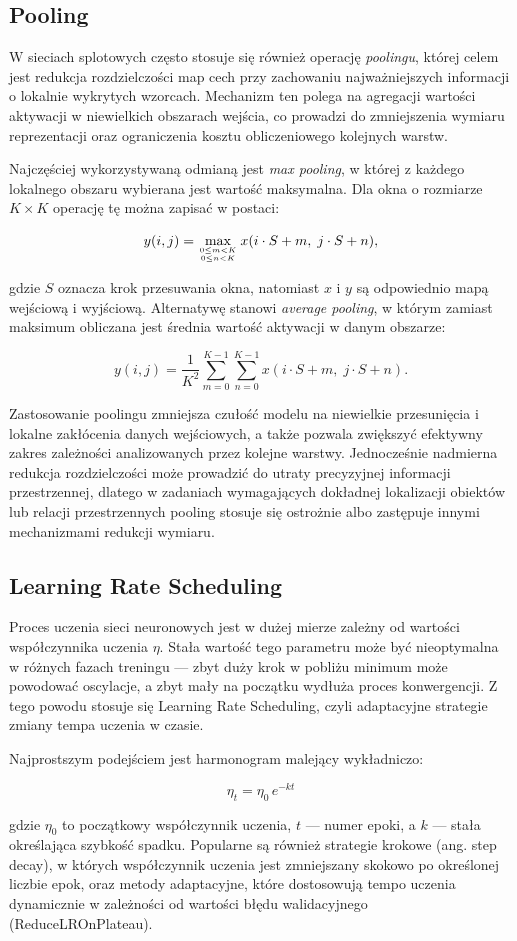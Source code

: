 \subsection*{Pooling}

W sieciach splotowych często stosuje się również operację \textit{poolingu}, której celem jest redukcja rozdzielczości map cech przy zachowaniu najważniejszych informacji o lokalnie wykrytych wzorcach. Mechanizm ten polega na agregacji wartości aktywacji w niewielkich obszarach wejścia, co prowadzi do zmniejszenia wymiaru reprezentacji oraz ograniczenia kosztu obliczeniowego kolejnych warstw.

Najczęściej wykorzystywaną odmianą jest \textit{max pooling}, w której z każdego lokalnego obszaru wybierana jest wartość maksymalna. Dla okna o rozmiarze $K \times K$ operację tę można zapisać w postaci:

\[
y(i,j) = \max_{0 \leq m < K \atop 0 \leq n < K} x(i \cdot S + m,\; j \cdot S + n),
\]

gdzie $S$ oznacza krok przesuwania okna, natomiast $x$ i $y$ są odpowiednio mapą wejściową i wyjściową. Alternatywę stanowi \textit{average pooling}, w którym zamiast maksimum obliczana jest średnia wartość aktywacji w danym obszarze:

\[
y(i,j) = \frac{1}{K^2} \sum_{m=0}^{K-1} \sum_{n=0}^{K-1} x(i \cdot S + m,\; j \cdot S + n).
\]

Zastosowanie poolingu zmniejsza czułość modelu na niewielkie przesunięcia i lokalne zakłócenia danych wejściowych, a także pozwala zwiększyć efektywny zakres zależności analizowanych przez kolejne warstwy. Jednocześnie nadmierna redukcja rozdzielczości może prowadzić do utraty precyzyjnej informacji przestrzennej, dlatego w zadaniach wymagających dokładnej lokalizacji obiektów lub relacji przestrzennych pooling stosuje się ostrożnie albo zastępuje innymi mechanizmami redukcji wymiaru. 

\subsection*{Learning Rate Scheduling}

Proces uczenia sieci neuronowych jest w dużej mierze zależny od wartości współczynnika uczenia $\eta$. Stała wartość tego parametru może być nieoptymalna w różnych fazach treningu — zbyt duży krok w pobliżu minimum może powodować oscylacje, a zbyt mały na początku wydłuża proces konwergencji.
Z tego powodu stosuje się Learning Rate Scheduling, czyli adaptacyjne strategie zmiany tempa uczenia w czasie.

Najprostszym podejściem jest harmonogram malejący wykładniczo:

\[
\eta_t = \eta_0 \, e^{-k t}
\]

gdzie $\eta_0$ to początkowy współczynnik uczenia, $t$ — numer epoki, a $k$ — stała określająca szybkość spadku.
Popularne są również strategie krokowe (ang. step decay), w których współczynnik uczenia jest zmniejszany skokowo po określonej liczbie epok, oraz metody adaptacyjne, które dostosowują tempo uczenia dynamicznie w zależności od wartości błędu walidacyjnego (ReduceLROnPlateau).